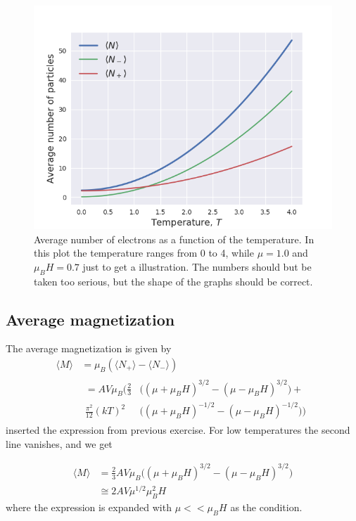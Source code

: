 \documentclass[norsk,a4paper,12pt]{article}
\begin{document}
\begin{figure}[h]
\centering
\includegraphics[width=150mm]{2_1.png}
\caption{Average number of electrons as a function of the temperature. In this plot the temperature ranges from 0 to 4, while $\mu=1.0$ and $\mu_BH=0.7$ just to get a illustration. The numbers should but be taken too serious, but the shape of the graphs should be correct. \label{avg}}
\end{figure}

\subsection{Average magnetization}
The average magnetization is given by
\begin{align}
\langle M\rangle&=\mu_B(\langle N_+\rangle-\langle N_-\rangle)\\
&
\begin{aligned}
=AV\mu_B\bigg(\frac{2}{3}&\Big((\mu+\mu_BH)^{3/2}-(\mu-\mu_BH)^{3/2}\Big)+\\
\frac{\pi^2}{12}(kT)^2&\Big((\mu+\mu_BH)^{-1/2}-(\mu-\mu_BH)^{-1/2}\Big)\bigg)
\end{aligned}
\end{align}
inserted the expression from previous exercise. For low temperatures the second line vanishes, and we get

\begin{align}
\langle M\rangle&=\frac{2}{3}AV\mu_B\Big((\mu+\mu_BH)^{3/2}-(\mu-\mu_BH)^{3/2}\Big)\\
&\cong2AV\mu^{1/2}\mu_B^2H
\end{align}
where the expression is expanded with $\mu<<\mu_BH$ as the condition.
\end{document}
